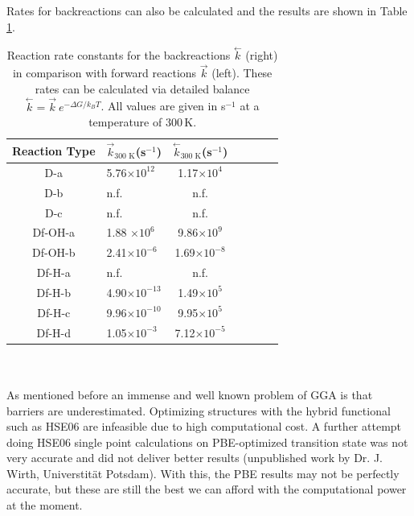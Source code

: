 \documentclass[11pt,DIV=13,BCOR=5mm,a4paper,headinclude]{scrbook}
\begin{document}
Rates for backreactions can also be calculated and the results are shown in Table \ref{tab:backreactions}.
\begin{table}[ht]
  \centering
  \caption{Reaction rate constants for the backreactions $\stackrel{\leftarrow}{k}$ (right) in comparison with forward reactions $\stackrel{\rightarrow}{k}$ (left).
These rates can be calculated via detailed balance $\stackrel{\leftarrow}{k}  = \stackrel{\rightarrow}{k} \ e^{-\Delta G/k_B T}$.
All values are given in s$^{-1}$ at a temperature of $300\,$K.}
  \begin{tabular}{cl|cc|cc|c}
  \toprule
\small{Reaction Type} & \small{$\stackrel{\rightarrow}{k}_\textrm{300 K}$(s$^{-1}$)} &  \small{$\stackrel{\leftarrow}{k}_\textrm{300 K}$(s$^{-1}$)} \\\midrule
 \small{D-a}   & \small{5.76$\times 10^{12}$} &\small{1.17$\times 10^4$}\\
 \small{D-b}   & \small{n.f.} & \small{n.f.} \\
 \small{D-c}   & \small{n.f.} & \small{n.f.}  \\\midrule
 \small{Df-OH-a} & \small{1.88 $\times  10^6$}&\small{9.86$\times 10^9$} \\
 \small{Df-OH-b}  & \small{2.41$\times 10^{-6}$}& \small{1.69$\times 10^{-8}$}\\\midrule
 \small{Df-H-a} & \small{n.f.} &\small{n.f.} \\
 \small{Df-H-b}  & \small{4.90$\times 10^{-13}$} &\small{1.49$\times 10^5$} \\
 \small{Df-H-c} & \small{9.96$\times 10^{-10}$}& \small{9.95$\times 10^5$}\\
 \small{Df-H-d} & \small{1.05$\times 10^{-3}$} &\small{7.12$\times 10^{-5}$} \\\bottomrule
  \end{tabular}
  \label{tab:backreactions}
\end{table}
\\\\
As mentioned before an immense and well known problem of GGA is that barriers are underestimated\cite{Zhao05}.
Optimizing structures with the hybrid functional such as HSE06 are infeasible due to high computational cost. %
A further attempt doing HSE06 single point calculations on PBE-optimized transition state was not very accurate and did not deliver better results (unpublished work by Dr. J. Wirth, Universtität Potsdam).
With this, the PBE results may not be perfectly accurate, but these are still the best we can afford with the computational power at the moment.
\end{document}
